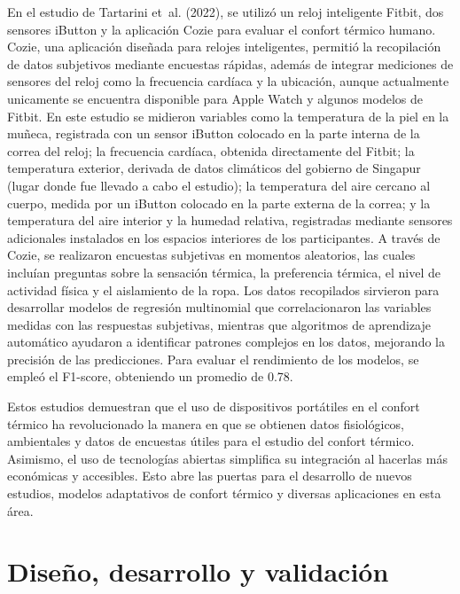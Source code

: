 \documentclass[
  12pt,
  letterpaper,
  DIV=11,
  numbers=noendperiod]{scrreport}
\begin{document}
En el estudio de Tartarini et~al. (2022), se utilizó un reloj
inteligente Fitbit, dos sensores iButton y la aplicación Cozie para
evaluar el confort térmico humano. Cozie, una aplicación diseñada para
relojes inteligentes, permitió la recopilación de datos subjetivos
mediante encuestas rápidas, además de integrar mediciones de sensores
del reloj como la frecuencia cardíaca y la ubicación, aunque actualmente
unicamente se encuentra disponible para Apple Watch y algunos modelos de
Fitbit. En este estudio se midieron variables como la temperatura de la
piel en la muñeca, registrada con un sensor iButton colocado en la parte
interna de la correa del reloj; la frecuencia cardíaca, obtenida
directamente del Fitbit; la temperatura exterior, derivada de datos
climáticos del gobierno de Singapur (lugar donde fue llevado a cabo el
estudio); la temperatura del aire cercano al cuerpo, medida por un
iButton colocado en la parte externa de la correa; y la temperatura del
aire interior y la humedad relativa, registradas mediante sensores
adicionales instalados en los espacios interiores de los participantes.
A través de Cozie, se realizaron encuestas subjetivas en momentos
aleatorios, las cuales incluían preguntas sobre la sensación térmica, la
preferencia térmica, el nivel de actividad física y el aislamiento de la
ropa. Los datos recopilados sirvieron para desarrollar modelos de
regresión multinomial que correlacionaron las variables medidas con las
respuestas subjetivas, mientras que algoritmos de aprendizaje automático
ayudaron a identificar patrones complejos en los datos, mejorando la
precisión de las predicciones. Para evaluar el rendimiento de los
modelos, se empleó el F1-score, obteniendo un promedio de 0.78.

Estos estudios demuestran que el uso de dispositivos portátiles en el
confort térmico ha revolucionado la manera en que se obtienen datos
fisiológicos, ambientales y datos de encuestas útiles para el estudio
del confort térmico. Asimismo, el uso de tecnologías abiertas simplifica
su integración al hacerlas más económicas y accesibles. Esto abre las
puertas para el desarrollo de nuevos estudios, modelos adaptativos de
confort térmico y diversas aplicaciones en esta área.


\hypertarget{cap-desarrollo}{%
\chapter{Diseño, desarrollo y validación}\label{cap-desarrollo}}
\end{document}
